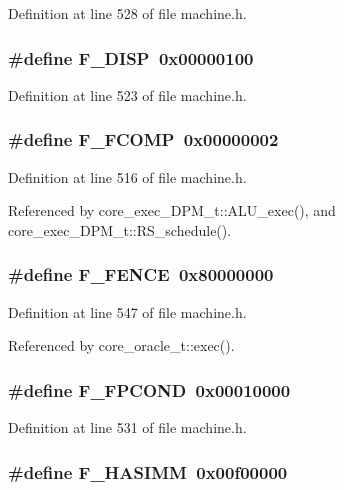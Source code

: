 Definition at line 528 of file machine.h.
\subsubsection[{F\_\-DISP}]{\setlength{\rightskip}{0pt plus 5cm}\#define F\_\-DISP~0x00000100}\label{machine_8h_eef9e3b82606c667de22ceadaeaf1c41}




Definition at line 523 of file machine.h.
\subsubsection[{F\_\-FCOMP}]{\setlength{\rightskip}{0pt plus 5cm}\#define F\_\-FCOMP~0x00000002}\label{machine_8h_96492ad3766dc5f2ef84c5ef6a197e11}




Definition at line 516 of file machine.h.

Referenced by core\_\-exec\_\-DPM\_\-t::ALU\_\-exec(), and core\_\-exec\_\-DPM\_\-t::RS\_\-schedule().
\subsubsection[{F\_\-FENCE}]{\setlength{\rightskip}{0pt plus 5cm}\#define F\_\-FENCE~0x80000000}\label{machine_8h_f22e51ade054d5be4b47a3c1c87ef688}




Definition at line 547 of file machine.h.

Referenced by core\_\-oracle\_\-t::exec().
\subsubsection[{F\_\-FPCOND}]{\setlength{\rightskip}{0pt plus 5cm}\#define F\_\-FPCOND~0x00010000}\label{machine_8h_574ad50830bad9b840fbd5531c3c4b85}




Definition at line 531 of file machine.h.
\subsubsection[{F\_\-HASIMM}]{\setlength{\rightskip}{0pt plus 5cm}\#define F\_\-HASIMM~0x00f00000}\label{machine_8h_aef2a06fe36dae503f76028b4ab49816}




